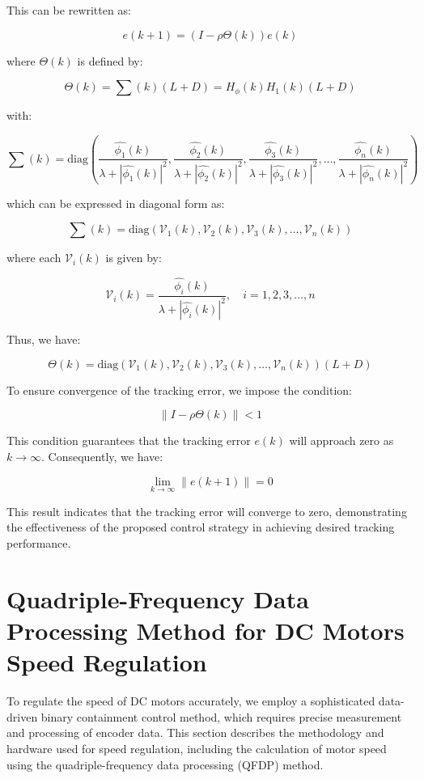 \documentclass[journal,onecolumn]{IEEEtran}
\begin{document}
This can be rewritten as:

\begin{equation}
    \label{model 35}
    e(k+1) = (I - \rho \Theta(k)) e(k)
\end{equation}

where \(\Theta(k)\) is defined by:

\[
\Theta(k) = \sum(k) (L + D) = H_\phi(k) H_1(k) (L + D)
\]

with:

\[
\sum(k) = \text{diag}\left(\frac{\hat{\phi_1}(k)}{\lambda + |\hat{\phi_1}(k)|^2}, \frac{\hat{\phi_2}(k)}{\lambda + |\hat{\phi_2}(k)|^2}, \frac{\hat{\phi_3}(k)}{\lambda + |\hat{\phi_3}(k)|^2}, \dots, \frac{\hat{\phi_n}(k)}{\lambda + |\hat{\phi_n}(k)|^2}\right)
\]

which can be expressed in diagonal form as:

\[
\sum(k) = \text{diag}(\mathcal{V}_1(k), \mathcal{V}_2(k), \mathcal{V}_3(k), \dots, \mathcal{V}_n(k))
\]

where each \(\mathcal{V}_i(k)\) is given by:

\[
\mathcal{V}_i(k) = \frac{\hat{\phi_i}(k)}{\lambda + |\hat{\phi_i}(k)|^2}, \quad i = 1, 2, 3, \dots, n
\]

Thus, we have:

\[
\Theta(k) = \text{diag}(\mathcal{V}_1(k), \mathcal{V}_2(k), \mathcal{V}_3(k), \dots, \mathcal{V}_n(k)) (L + D)
\]

To ensure convergence of the tracking error, we impose the condition:

\begin{equation}
    \label{model 36}
    \|I - \rho \Theta(k)\| < 1
\end{equation}

This condition guarantees that the tracking error \(e(k)\) will approach zero as \(k \to \infty\). Consequently, we have:

\[
\lim_{k \to \infty} \|e(k+1)\| = 0
\]

This result indicates that the tracking error will converge to zero, demonstrating the effectiveness of the proposed control strategy in achieving desired tracking performance.

\section{Quadriple-Frequency Data Processing Method for DC Motors Speed Regulation}

To regulate the speed of DC motors accurately, we employ a sophisticated data-driven binary containment control method, which requires precise measurement and processing of encoder data. This section describes the methodology and hardware used for speed regulation, including the calculation of motor speed using the quadriple-frequency data processing (QFDP) method.
\end{document}
